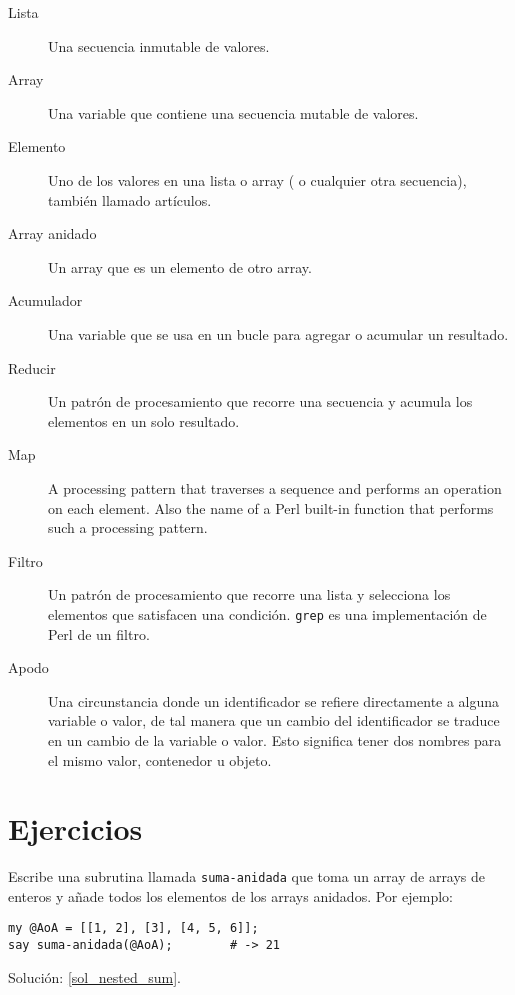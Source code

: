 \begin{description}

\item[Lista] Una secuencia inmutable de valores.

\item[Array] Una variable que contiene una secuencia mutable
de valores.

\item[Elemento] Uno de los valores en una lista o array (
o cualquier otra secuencia), también llamado artículos.

\item[Array anidado] Un array que es un elemento de otro array.

\item[Acumulador] Una variable que se usa en un bucle 
para agregar o acumular un resultado.

\item[Reducir] Un patrón de procesamiento que recorre
una secuencia y acumula los elementos en un solo
resultado.

\item[Map] A processing pattern that traverses a 
sequence and performs an operation on each element. 
Also the name of a Perl built-in function that performs 
such a processing pattern.

\item[Filtro] Un patrón de procesamiento que recorre una
lista y selecciona los elementos que satisfacen una condición.
{\tt grep} es una implementación de Perl de un filtro.

\item[Apodo] Una circunstancia donde un identificador
se refiere directamente a alguna variable o valor, 
de tal manera que un cambio del identificador
se traduce en un cambio de la variable o valor. 
Esto significa tener dos nombres para el mismo valor,
contenedor u objeto.

\end{description}


\section{Ejercicios}
\label{array_exercises}

\begin{exercise}

Escribe una subrutina llamada \verb|suma-anidada| que toma un
array de arrays de enteros y añade todos los elementos de los
arrays anidados. Por ejemplo:
\label{nested_sum}

\begin{lstlisting}
my @AoA = [[1, 2], [3], [4, 5, 6]];
say suma-anidada(@AoA);        # -> 21
\end{lstlisting}

Solución: \ref{sol_nested_sum}.

\end{exercise}

